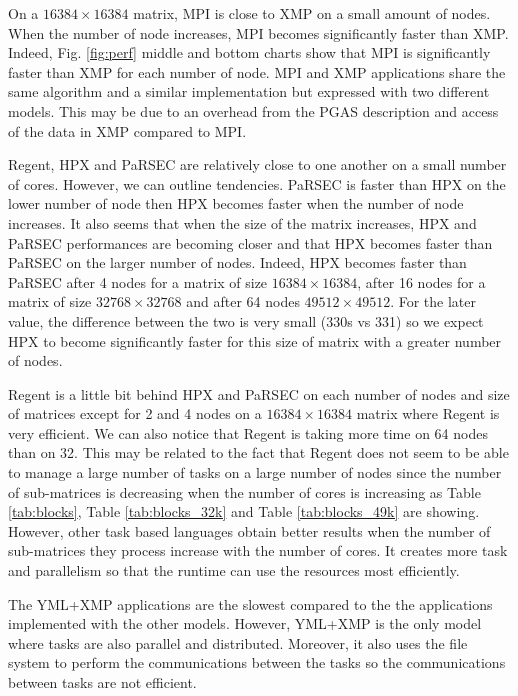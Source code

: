 On a $16384 \times 16384$ matrix, MPI is close to XMP on a small amount of nodes.
When the number of node increases, MPI becomes significantly faster than XMP.
Indeed, Fig. \ref{fig:perf} middle and bottom charts show that MPI is significantly faster than XMP for each number of node.
MPI and XMP applications share the same algorithm and a similar implementation but expressed with two different models.
This may be due to an overhead from the PGAS description and access of the data in XMP compared to MPI.

Regent, HPX and PaRSEC are relatively close to one another on a small number of cores.
However, we can outline tendencies.
PaRSEC is faster than HPX on the lower number of node then HPX becomes faster when the number of node increases.
It also seems that when the size of the matrix increases, HPX and PaRSEC performances are becoming closer and that HPX becomes faster than PaRSEC on the larger number of nodes.
Indeed, HPX becomes faster than PaRSEC after 4 nodes for a  matrix of size $16384 \times 16384$, after 16 nodes for a matrix of size $32768 \times 32768$ and after 64 nodes $49512 \times 49512$.
For the later value, the difference between the two is very small (330s vs 331) so we expect HPX to become significantly faster for this size of matrix with a greater number of nodes.

Regent is a little bit behind HPX and PaRSEC on each number of nodes and size of matrices except for 2 and 4 nodes on a $16384 \times 16384$ matrix where Regent is very efficient.
We can also notice that Regent is taking more time on 64 nodes than on 32.
This may be related to the fact that Regent does not seem to be able to manage a large number of tasks on a large number of nodes since the number of sub-matrices is decreasing when the number of cores is increasing as Table \ref{tab:blocks}, Table \ref{tab:blocks_32k} and Table \ref{tab:blocks_49k} are showing.
However, other task based languages obtain better results when the number of sub-matrices they process increase with the number of cores.
It creates more task and parallelism so that the runtime can use the resources most efficiently.

The YML+XMP applications are the slowest compared to the the applications implemented with the other models.
However, YML+XMP is the only model where tasks are also parallel and distributed.
Moreover, it also uses the file system to perform the communications between the tasks so the communications between tasks are not efficient.

